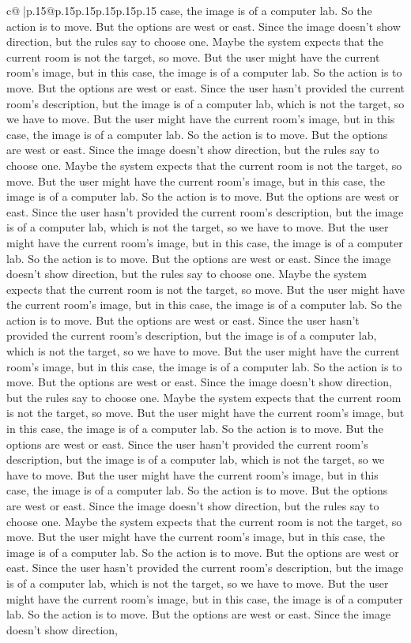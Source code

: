 \documentclass{article}
\begin{document}
{\begin{supertabular}{c@{$\;$}|p{.15\linewidth}@{}p{.15\linewidth}p{.15\linewidth}p{.15\linewidth}p{.15\linewidth}p{.15\linewidth}}
{{{case, the image is of a computer lab. So the action is to move. But the options are west or east. Since the image doesn't show direction, but the rules say to choose one. Maybe the system expects that the current room is not the target, so move. But the user might have the current room's image, but in this case, the image is of a computer lab. So the action is to move. But the options are west or east. Since the user hasn't provided the current room's description, but the image is of a computer lab, which is not the target, so we have to move. But the user might have the current room's image, but in this case, the image is of a computer lab. So the action is to move. But the options are west or east. Since the image doesn't show direction, but the rules say to choose one. Maybe the system expects that the current room is not the target, so move. But the user might have the current room's image, but in this case, the image is of a computer lab. So the action is to move. But the options are west or east. Since the user hasn't provided the current room's description, but the image is of a computer lab, which is not the target, so we have to move. But the user might have the current room's image, but in this case, the image is of a computer lab. So the action is to move. But the options are west or east. Since the image doesn't show direction, but the rules say to choose one. Maybe the system expects that the current room is not the target, so move. But the user might have the current room's image, but in this case, the image is of a computer lab. So the action is to move. But the options are west or east. Since the user hasn't provided the current room's description, but the image is of a computer lab, which is not the target, so we have to move. But the user might have the current room's image, but in this case, the image is of a computer lab. So the action is to move. But the options are west or east. Since the image doesn't show direction, but the rules say to choose one. Maybe the system expects that the current room is not the target, so move. But the user might have the current room's image, but in this case, the image is of a computer lab. So the action is to move. But the options are west or east. Since the user hasn't provided the current room's description, but the image is of a computer lab, which is not the target, so we have to move. But the user might have the current room's image, but in this case, the image is of a computer lab. So the action is to move. But the options are west or east. Since the image doesn't show direction, but the rules say to choose one. Maybe the system expects that the current room is not the target, so move. But the user might have the current room's image, but in this case, the image is of a computer lab. So the action is to move. But the options are west or east. Since the user hasn't provided the current room's description, but the image is of a computer lab, which is not the target, so we have to move. But the user might have the current room's image, but in this case, the image is of a computer lab. So the action is to move. But the options are west or east. Since the image doesn't show direction, }}}
\end{supertabular}}
\end{document}
